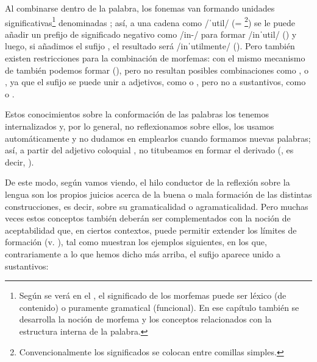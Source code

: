 Al combinarse dentro de la palabra, los fonemas van formando unidades
significativas\footnote{Según se verá en el , el significado de los
morfemas puede ser léxico (de contenido) o puramente gramatical (funcional). En
ese capítulo también se desarrolla la noción de morfema y los conceptos
relacionados con la estructura interna de la palabra.} denominadas
; así, a una cadena como /ˈutil/ (= \footnote{Convencionalmente los significados se colocan entre comillas
simples.}) se le puede añadir un prefijo de significado negativo como /in-/
para formar /inˈutil/ () y luego, si añadimos el
sufijo , el resultado será /inˈutilmente/ (). Pero también existen restricciones para la
combinación de morfemas: con el mismo mecanismo de  también
podemos formar  (), pero no resultan posibles combinaciones como
,  o
, ya que el sufijo  se puede unir a
adjetivos, como  o , pero no a
sustantivos, como  o .

Estos conocimientos sobre la conformación de las palabras los tenemos
internalizados y, por lo general, no reflexionamos sobre ellos, los usamos
automáticamente y no dudamos en emplearlos cuando formamos nuevas palabras;
así, a partir del adjetivo coloquial , no titubeamos en formar el
derivado  (, es decir, ).

De este modo, según vamos viendo, el hilo conductor de la reflexión sobre la
lengua son los propios juicios acerca de la buena o mala formación de las
distintas construcciones, es decir, sobre su gramaticalidad o agramaticalidad.
Pero muchas veces estos conceptos también deberán ser complementados con la
noción de aceptabilidad que, en ciertos contextos, puede permitir extender los
límites de formación (v. ), tal como muestran los ejemplos
siguientes, en los que, contrariamente a lo que hemos dicho más arriba, el
sufijo  aparece unido a sustantivos:

